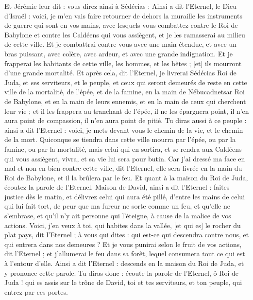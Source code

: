 \begin{multicols}{2}
Et Jérémie leur dit : vous direz ainsi à Sédécias :
Ainsi a dit l'Eternel, le Dieu d'Israël : voici, je m'en vais faire retourner de dehors la muraille les instruments de guerre qui sont en vos mains, avec lesquels vous combattez contre le Roi de Babylone et contre les Caldéens qui vous assiègent, et je les ramasserai au milieu de cette ville.
Et je combattrai contre vous avec une main étendue, et avec un bras puissant, avec colère, avec ardeur, et avec une grande indignation.
Et je frapperai les habitants de cette ville, les hommes, et les bêtes ; [et] ils mourront d'une grande mortalité.
Et après cela, dit l'Eternel, je livrerai Sédécias Roi de Juda, et ses serviteurs, et le peuple, et ceux qui seront demeurés de reste en cette ville de la mortalité, de l'épée, et de la famine, en la main de Nébucadnetsar Roi de Babylone, et en la main de leurs ennemis, et en la main de ceux qui cherchent leur vie ; et il les frappera au tranchant de l'épée, il ne les épargnera point, il n'en aura point de compassion, il n'en aura point de pitié.
Tu diras aussi à ce peuple : ainsi a dit l'Eternel : voici, je mets devant vous le chemin de la vie, et le chemin de la mort.
Quiconque se tiendra dans cette ville mourra par l'épée, ou par la famine, ou par la mortalité, mais celui qui en sortira, et se rendra aux Caldéens qui vous assiègent, vivra, et sa vie lui sera pour butin.
Car j'ai dressé ma face en mal et non en bien contre cette ville, dit l'Eternel, elle sera livrée en la main du Roi de Babylone, et il la brûlera par le feu.
Et quant à la maison du Roi de Juda, écoutez la parole de l'Eternel.
Maison de David, ainsi a dit l'Eternel : faites justice dès le matin, et délivrez celui qui aura été pillé, d'entre les mains de celui qui lui fait tort, de peur que ma fureur ne sorte comme un feu, et qu'elle ne s'embrase, et qu'il n'y ait personne qui l'éteigne, à cause de la malice de vos actions.
Voici, j'en veux à toi, qui habites dans la vallée, [et qui es] le rocher du plat pays, dit l'Eternel ; à vous qui dites : qui est-ce qui descendra contre nous, et qui entrera dans nos demeures ?
Et je vous punirai selon le fruit de vos actions, dit l'Eternel ; et j'allumerai le feu dans sa forêt, lequel consumera tout ce qui est à l'entour d'elle.
\VerseOne{}Ainsi a dit l'Eternel : descends en la maison du Roi de Juda, et y prononce cette parole.
Tu diras donc : écoute la parole de l'Eternel, ô Roi de Juda ! qui es assis sur le trône de David, toi et tes serviteurs, et ton peuple, qui entrez par ces portes.

\end{multicols}
